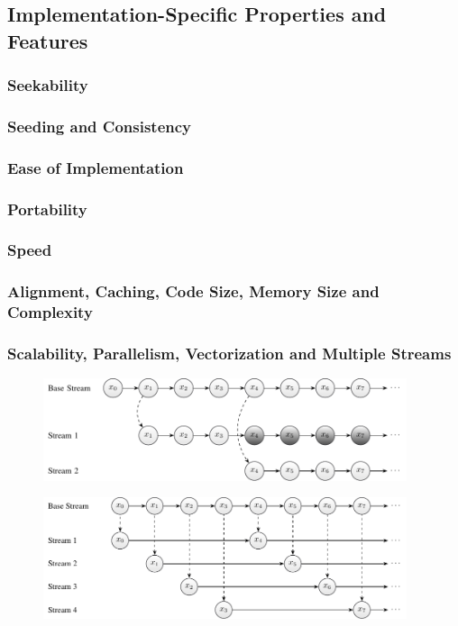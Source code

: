 \documentclass{stdlocal}
\begin{document}
  \subsection{Implementation-Specific Properties and Features}
  \subsubsection*{Seekability}
  \subsubsection*{Seeding and Consistency}
  \subsubsection*{Ease of Implementation}
  \subsubsection*{Portability}
  \subsubsection*{Speed}
  \subsubsection*{Alignment, Caching, Code Size, Memory Size and Complexity}
  \subsubsection*{Scalability, Parallelism, Vectorization and Multiple Streams}

  \autocite{lecuyer2017}

  \begin{figure}
    \center
    \includegraphics[width=0.95\textwidth]{figures/seeding_multiple_streams.pdf}
    \caption[Seeding Generation of Multiple Streams]{}
    \label{fig:leapfrogging-multiple-streams}
  \end{figure}

  \begin{figure}
    \center
    \includegraphics[width=0.95\textwidth]{figures/leapfrogging_multiple_streams.pdf}
    \caption[Leapfrogging Generation of Multiple Streams]{}
    \label{fig:leapfrogging-multiple-streams}
  \end{figure}
\end{document}
